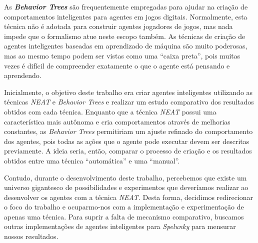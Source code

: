 
As \textbf{\textit{Behavior Trees}} são frequentemente empregadas para ajudar na
criação de comportamentos inteligentes para agentes em jogos digitais.
Normalmente, esta técnica não é adotada para construir agentes jogadores de
jogos, mas nada impede que o formalismo atue neste escopo também. As técnicas de
criação de agentes inteligentes baseadas em aprendizado de máquina são muito
poderosas, mas ao mesmo tempo podem ser vistas como uma ``caixa preta'', pois
muitas vezes é difícil de compreender exatamente o que o agente está pensando e
aprendendo.

Inicialmente, o objetivo deste trabalho era criar agentes inteligentes
utilizando as técnicas \textit{NEAT} e \textit{Behavior Trees} e realizar um
estudo comparativo dos resultados obtidos com cada técnica. Enquanto que a
técnica \textit{NEAT} possui uma característica mais autônoma e cria
comportamentos através de melhorias constantes, as \textit{Behavior Trees}
permitiriam um ajuste refinado do comportamento dos agentes, pois todas as ações
que o agente pode executar devem ser descritas previamente. A ideia seria,
então, comparar o processo de criação e os resultados obtidos entre uma técnica
``automática'' e uma ``manual''.

Contudo, durante o desenvolvimento deste trabalho, percebemos que existe um
universo gigantesco de possibilidades e experimentos que deveríamos realizar ao
desenvolver os agentes com a técnica \textit{NEAT}. Desta forma, decidimos
redirecionar o foco do trabalho e ocuparmo-nos com a implementação e
experimentação de apenas uma técnica. Para suprir a falta de mecanismo
comparativo, buscamos outras implementações de agentes inteligentes para
\textit{Spelunky} para mensurar nossos resultados.
